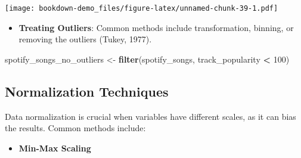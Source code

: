 \documentclass[
  b5paper]{book}
\newenvironment{Shaded}{\begin{snugshade}}{\end{snugshade}}
\newcommand{\DecValTok}[1]{\textcolor[rgb]{0.00,0.00,0.81}{#1}}
\newcommand{\FunctionTok}[1]{\textcolor[rgb]{0.13,0.29,0.53}{\textbf{#1}}}
\newcommand{\NormalTok}[1]{#1}
\newcommand{\OtherTok}[1]{\textcolor[rgb]{0.56,0.35,0.01}{#1}}
\newcommand{\SpecialCharTok}[1]{\textcolor[rgb]{0.81,0.36,0.00}{\textbf{#1}}}
\providecommand{\tightlist}{%
  \setlength{\itemsep}{0pt}\setlength{\parskip}{0pt}}
\begin{document}
\begin{Shaded}
\end{Shaded}

\texttt{[image: bookdown-demo\_files/figure-latex/unnamed-chunk-39-1.pdf]}

\begin{itemize}
\tightlist
\item
  \textbf{Treating Outliers}: Common methods include transformation, binning, or removing the outliers (Tukey, 1977).
\end{itemize}

\begin{Shaded}
\begin{Highlighting}[]
\NormalTok{spotify\_songs\_no\_outliers }\OtherTok{\textless{}{-}} \FunctionTok{filter}\NormalTok{(spotify\_songs, track\_popularity }\SpecialCharTok{\textless{}} \DecValTok{100}\NormalTok{)}
\end{Highlighting}
\end{Shaded}

\hypertarget{normalization-techniques}{%
\subsection{Normalization Techniques}\label{normalization-techniques}}

Data normalization is crucial when variables have different scales, as it can bias the results. Common methods include:

\begin{itemize}
\tightlist
\item
  \textbf{Min-Max Scaling}
\end{itemize}

\begin{Shaded}
\end{Shaded}
\end{document}
